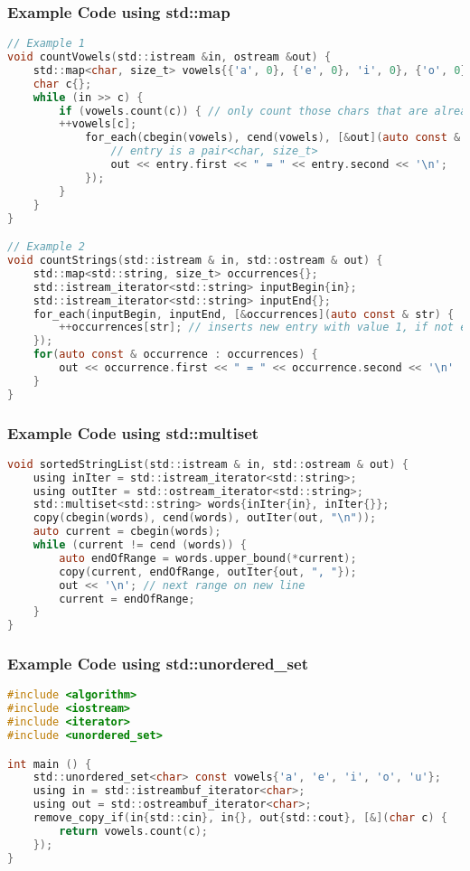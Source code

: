\subsubsection{Example Code using std::map}
\begin{lstlisting}[style=frame, style= linenumbers, language=C]
// Example 1
void countVowels(std::istream &in, ostream &out) {
    std::map<char, size_t> vowels{{'a', 0}, {'e', 0}, 'i', 0}, {'o', 0}, {'u', 0}, {'y', 0}};
    char c{};
    while (in >> c) {
        if (vowels.count(c)) { // only count those chars that are already in the map
        ++vowels[c];
            for_each(cbegin(vowels), cend(vowels), [&out](auto const & entry) {
                // entry is a pair<char, size_t>
                out << entry.first << " = " << entry.second << '\n';
            });
        }
    }
}

// Example 2
void countStrings(std::istream & in, std::ostream & out) {
    std::map<std::string, size_t> occurrences{};
    std::istream_iterator<std::string> inputBegin{in};
    std::istream_iterator<std::string> inputEnd{};
    for_each(inputBegin, inputEnd, [&occurrences](auto const & str) {
        ++occurrences[str]; // inserts new entry with value 1, if not existst, else: counts ++
    });
    for(auto const & occurrence : occurrences) {
        out << occurrence.first << " = " << occurrence.second << '\n'
    }
}
\end{lstlisting}

\subsubsection{Example Code using std::multiset}
\begin{lstlisting}[style=frame, style= linenumbers, language=C]
void sortedStringList(std::istream & in, std::ostream & out) {
    using inIter = std::istream_iterator<std::string>;
    using outIter = std::ostream_iterator<std::string>;
    std::multiset<std::string> words{inIter{in}, inIter{}};
    copy(cbegin(words), cend(words), outIter(out, "\n"));
    auto current = cbegin(words);
    while (current != cend (words)) {
        auto endOfRange = words.upper_bound(*current);
        copy(current, endOfRange, outIter{out, ", "});
        out << '\n'; // next range on new line
        current = endOfRange;
    }
}
\end{lstlisting}

\subsubsection{Example Code using std::unordered\_set}
\begin{lstlisting}[style=frame, style= linenumbers, language=C]
#include <algorithm>
#include <iostream>
#include <iterator>
#include <unordered_set>

int main () {
    std::unordered_set<char> const vowels{'a', 'e', 'i', 'o', 'u'};
    using in = std::istreambuf_iterator<char>;
    using out = std::ostreambuf_iterator<char>;
    remove_copy_if(in{std::cin}, in{}, out{std::cout}, [&](char c) {
        return vowels.count(c);
    });
}
\end{lstlisting}

